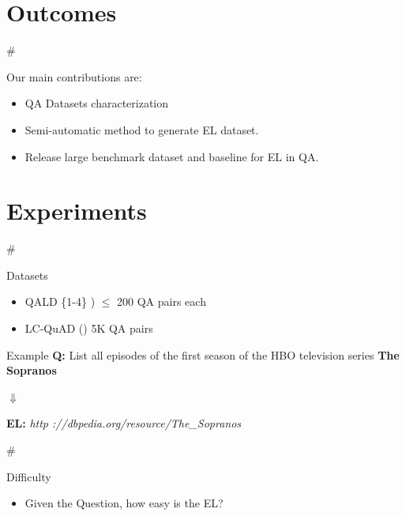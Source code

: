 \documentclass[]{beamer}
\def\mAlertSpace{\vspace{0.5em}}
\newcommand{\mSlideTitle}{{{\color{gray}\secname}} \# \subsecname}
\begin{document}
\section{Outcomes}
  \begin{frame}{\mSlideTitle}
    \begin{alertblock}{Our main contributions are:}
      \begin{itemize}
        \item QA Datasets characterization
        \item Semi-automatic method to generate EL dataset.
        \item Release large benchmark dataset and baseline for EL in QA.
      \end{itemize}
    \end{alertblock}      
  \end{frame}

\section{Experiments}
  \begin{frame}{\mSlideTitle}
    \begin{alertblock}{Datasets}
      \begin{itemize}
        \item QALD \{1-4\} \cite{Unger2014}) $\le$ 200 QA pairs each
        \item LC-QuAD (\cite{trivedi2017lc}) 5K QA pairs
      \end{itemize}
    \end{alertblock}
    \begin{alertblock}{Example}
      \mAlertSpace
      \textbf{Q:} List all episodes of the first season of the HBO television series \textbf{The Sopranos} \\
      {\centering
        $\Downarrow$ \par
      }
      \textbf{EL:} \textit{http ://dbpedia.org/resource/The\_Sopranos}
    \end{alertblock}
  \end{frame}

  \begin{frame}{\mSlideTitle}
    \begin{alertblock}{Difficulty}
      \begin{itemize}
        \item Given the Question, how easy is the EL?
      \end{itemize}
      
    \end{alertblock}
  \end{frame}
\end{document}

